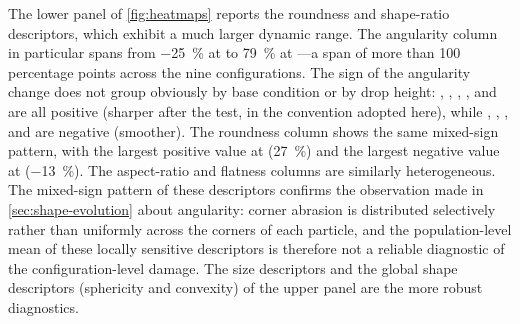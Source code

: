 The lower panel of \cref{fig:heatmaps} reports the roundness and shape-ratio descriptors, which exhibit a much larger dynamic range. The angularity column in particular spans from \qty{-25}{\percent} at  to \qty{+79}{\percent} at ---a span of more than 100 percentage points across the nine configurations. The sign of the angularity change does not group obviously by base condition or by drop height: , , , , and  are all positive (sharper after the test, in the convention adopted here), while , , , and  are negative (smoother). The roundness column shows the same mixed-sign pattern, with the largest positive value at  (\qty{+27}{\percent}) and the largest negative value at  (\qty{-13}{\percent}). The aspect-ratio and flatness columns are similarly heterogeneous. The mixed-sign pattern of these descriptors confirms the observation made in \cref{sec:shape-evolution} about angularity: corner abrasion is distributed selectively rather than uniformly across the corners of each particle, and the population-level mean of these locally sensitive descriptors is therefore not a reliable diagnostic of the configuration-level damage. The size descriptors and the global shape descriptors (sphericity and convexity) of the upper panel are the more robust diagnostics.
